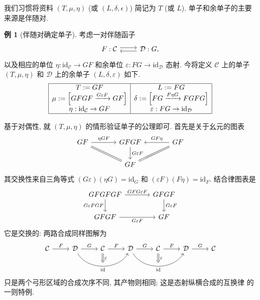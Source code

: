 \documentclass[11pt]{article}
\newcommand{\identity}{\mathrm{id}}
\newcommand{\CorpusNumber}{0}
\theoremstyle{definition}
\newtheorem{example}[theorem]{例}
\begin{document}
我们习惯将资料 $(T, \mu, \eta)$ (或 $(L, \delta, \epsilon)$) 简记为 $T$ (或 $L$). 单子和余单子的主要来源是伴随对.

\def\CorpusNumber{7.6.2}
\begin{example}[伴随对确定单子]\label{eg:adjunction-monad}
	考虑一对伴随函子
	\[\begin{tikzcd}
		F: \mathcal{C} \arrow[shift left, r] & \mathcal{D}: G \arrow[shift left, l],
	\end{tikzcd}\]
	以及相应的单位 $\eta: \identity_{\mathcal{C}} \to GF$ 和余单位 $\varepsilon: FG \to \identity_{\mathcal{D}}$ 态射. 今将定义 $\mathcal{C}$ 上的单子 $(T, \mu, \eta)$ 和 $\mathcal{D}$ 上的余单子 $(L, \delta, \varepsilon)$ 如下.
	\[\begin{array}{|c|c|}\hline
		T := GF & L := FG \\
		\mu := \left[ GFGF \xrightarrow{G\varepsilon F} GF \right] & \delta := \left[ FG \xrightarrow{F\eta G} FGFG \right] \\
		\eta : \identity_{\mathcal{C}} \to GF & \varepsilon: FG \to \identity_{\mathcal{D}} \\ \hline 
	\end{array}\]

	基于对偶性, 就 $(T, \mu, \eta)$ 的情形验证单子的公理即可. 首先是关于幺元的图表
	\[\begin{tikzcd}[column sep=large]
		GF \arrow[r, "{\eta GF}"] \arrow[equal, rd] & GFGF \arrow[d, "{G\varepsilon F}"] & GF \arrow[l, "{GF\eta}"'] \arrow[equal, ld] \\
		& GF &
	\end{tikzcd}\]
	其交换性来自三角等式 $(G\varepsilon)(\eta G) = \identity_G$ 和 $(\varepsilon F)(F\eta) = \identity_F$. 结合律图表是
	\[\begin{tikzcd}[column sep=large]
		GFGFGF \arrow[d, "{G\varepsilon FGF}"'] \arrow[r, "{GFG\varepsilon F}"] & GFGF \arrow[d, "G\varepsilon F"] \\
		GFGF \arrow[r, "G\varepsilon F"'] & GF
	\end{tikzcd}\]
	它是交换的: 两路合成同样图解为
	\[\begin{tikzcd}
		\mathcal{C} \arrow[r, "F"] & \mathcal{D} \arrow[r, "G"] \arrow[rr, bend right=60, ""{name=A}, "{\identity}"'] & \mathcal{C} \arrow[r, "F"] \arrow[Rightarrow, to=A, "\varepsilon"] &
		\mathcal{D} \arrow[r, "G"] \arrow[rr, bend right=60, ""{name=B}, "{\identity}"'] & \mathcal{C} \arrow[r, "F"] \arrow[Rightarrow, to=B, "\varepsilon"] & \mathcal{D} \arrow[r, "G"] & \mathcal{C}
	\end{tikzcd}\]
	只是两个弓形区域的合成次序不同, 其产物则相同; 这是态射纵横合成的互换律 \cite[引理 2.2.7]{Li1} 的一则特例.
\end{example}
\end{document}
